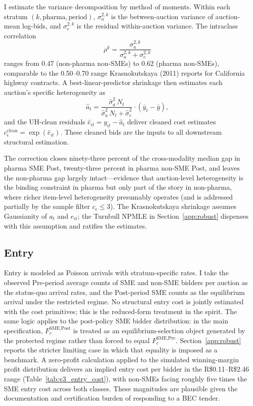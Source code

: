 I estimate the variance decomposition by method of moments. Within each stratum $(k, \text{pharma}, \text{period})$, $\sigma_a^{2,k}$ is the between-auction variance of auction-mean log-bids, and $\sigma_e^{2,k}$ is the residual within-auction variance. The intraclass correlation
\[
\rho^k = \frac{\sigma_a^{2,k}}{\sigma_a^{2,k} + \sigma_e^{2,k}}
\]
ranges from 0.47 (non-pharma non-SMEs) to 0.62 (pharma non-SMEs), comparable to the 0.50--0.70 range Krasnokutskaya (2011) reports for California highway contracts. A best-linear-predictor shrinkage then estimates each auction's specific heterogeneity as
\[
\hat{a}_t = \frac{\hat\sigma_a^2 \, N_t}{\hat\sigma_a^2 \, N_t + \hat\sigma_e^2} \cdot \left( \bar y_t - \bar y \right),
\]
and the UH-clean residuals $\hat e_{it} = y_{it} - \hat a_t$ deliver cleaned cost estimates $c_\epsilon^{\text{clean}} = \exp(\hat e_{it})$. These cleaned bids are the inputs to all downstream structural estimation.

The correction closes ninety-three percent of the cross-modality median gap in pharma SME Post, twenty-three percent in pharma non-SME Post, and leaves the non-pharma gap largely intact---evidence that auction-level heterogeneity is the binding constraint in pharma but only part of the story in non-pharma, where richer item-level heterogeneity presumably operates (and is addressed partially by the sample filter $c_\epsilon \le 3$). The Krasnokutskaya shrinkage assumes Gaussianity of $a_t$ and $e_{it}$; the Turnbull NPMLE in Section~\ref{app:robust} dispenses with this assumption and ratifies the estimates.

\subsection{Entry}

Entry is modeled as Poisson arrivals with stratum-specific rates. I take the observed Pre-period average counts of SME and non-SME bidders per auction as the status-quo arrival rates, and the Post-period SME counts as the equilibrium arrival under the restricted regime. No structural entry cost is jointly estimated with the cost primitives; this is the reduced-form treatment in the \citet{atheyseira2011} spirit. The same logic applies to the post-policy SME bidder distribution: in the main specification, $F_c^{\text{SME,Post}}$ is treated as an equilibrium-selection object generated by the protected regime rather than forced to equal $F_c^{\text{SME,Pre}}$. Section~\ref{app:robust} reports the stricter limiting case in which that equality is imposed as a benchmark. A zero-profit calculation applied to the simulated winning-margin profit distribution delivers an implied entry cost per bidder in the R\$0.11--R\$2.46 range (Table~\ref{tab:v3_entry_cost}), with non-SMEs facing roughly five times the SME entry cost across both classes. These magnitudes are plausible given the documentation and certification burden of responding to a BEC tender.

